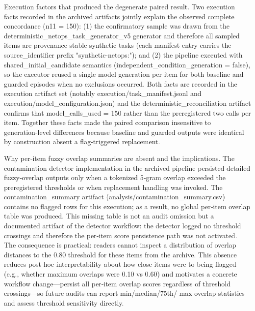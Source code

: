 \documentclass[conference]{IEEEtran}
\begin{document}
Execution factors that produced the degenerate paired result. Two execution facts recorded in the archived artifacts jointly explain the observed complete concordance (n11 = 150): (1) the confirmatory sample was drawn from the deterministic\_netops\_task\_generator\_v5 generator and therefore all sampled items are provenance‑stable synthetic tasks (each manifest entry carries the source\_identifier prefix "synthetic-netops:"); and (2) the pipeline executed with shared\_initial\_candidate semantics (independent\_condition\_generation = false), so the executor reused a single model generation per item for both baseline and guarded episodes when no exclusions occurred. Both facts are recorded in the execution artifact set (notably execution/task\_manifest.jsonl and execution/model\_configuration.json) and the deterministic\_reconciliation artifact confirms that model\_calls\_used = 150 rather than the preregistered two calls per item. Together these facts made the paired comparison insensitive to generation‑level differences because baseline and guarded outputs were identical by construction absent a flag-triggered replacement.

Why per‑item fuzzy overlap summaries are absent and the implications. The contamination detector implementation in the archived pipeline persisted detailed fuzzy‑overlap outputs only when a tokenized 5‑gram overlap exceeded the preregistered thresholds or when replacement handling was invoked. The contamination\_summary artifact (analysis/contamination\_summary.csv) contains no flagged rows for this execution; as a result, no global per‑item overlap table was produced. This missing table is not an audit omission but a documented artifact of the detector workflow: the detector logged no threshold crossings and therefore the per‑item score persistence path was not activated. The consequence is practical: readers cannot inspect a distribution of overlap distances to the 0.80 threshold for these items from the archive. This absence reduces post‑hoc interpretability about how close items were to being flagged (e.g., whether maximum overlaps were 0.10 vs 0.60) and motivates a concrete workflow change---persist all per‑item overlap scores regardless of threshold crossings---so future audits can report min/median/75th/ max overlap statistics and assess threshold sensitivity directly.
\end{document}
